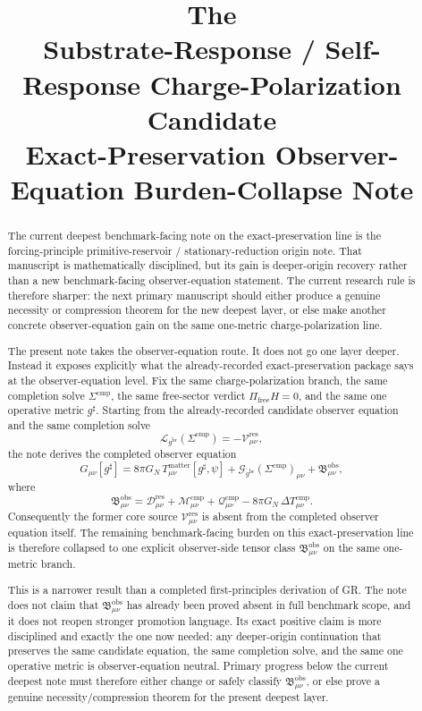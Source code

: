 \documentclass[11pt]{article}
\title{\textbf{The \TheoryName{}}\\[0.4em]
\large Substrate-Response / Self-Response Charge-Polarization Candidate\\
\large Exact-Preservation Observer-Equation Burden-Collapse Note}
\author{}
\date{}
\newcommand{\ObserverMetric}{g^{\mathrm{br}}}
\newcommand{\CompletedMetric}{g^{\sharp}}
\newcommand{\CompShift}{\Sigma^{\mathrm{cmp}}}
\newcommand{\ResidualCore}{\mathcal V_{\mu\nu}^{\mathrm{res}}}
\newcommand{\ResidualDec}{\mathcal D_{\mu\nu}^{\mathrm{res}}}
\newcommand{\ReducedEin}{\mathcal L_{\ObserverMetric}}
\newcommand{\GaugeBook}{\mathcal G_{\ObserverMetric}}
\newcommand{\CompMix}{\mathcal M_{\mu\nu}^{\mathrm{cmp}}}
\newcommand{\CompQuad}{\mathcal Q_{\mu\nu}^{\mathrm{cmp}}}
\newcommand{\DeltaTComp}{\Delta T_{\mu\nu}^{\mathrm{cmp}}}
\newcommand{\ObsBurden}{\mathfrak B_{\mu\nu}^{\mathrm{obs}}}
\begin{document}
\maketitle

\begin{abstract}
The current deepest benchmark-facing note on the exact-preservation line is the forcing-principle primitive-reservoir / stationary-reduction origin note. That manuscript is mathematically disciplined, but its gain is deeper-origin recovery rather than a new benchmark-facing observer-equation statement. The current research rule is therefore sharper: the next primary manuscript should either produce a genuine necessity or compression theorem for the new deepest layer, or else make another concrete observer-equation gain on the same one-metric charge-polarization line.

The present note takes the observer-equation route. It does not go one layer deeper. Instead it exposes explicitly what the already-recorded exact-preservation package says at the observer-equation level. Fix the same charge-polarization branch, the same completion solve \(\Sigma^{\mathrm{cmp}}\), the same free-sector verdict \(\Pi_{\mathrm{free}}H=0\), and the same one operative metric \(\CompletedMetric\). Starting from the already-recorded candidate observer equation and the same completion solve
\[
\ReducedEin(\CompShift)=-\ResidualCore,
\]
the note derives the completed observer equation
\[
G_{\mu\nu}[\CompletedMetric]
=
8\pi G_N\,T_{\mu\nu}^{\mathrm{matter}}[\CompletedMetric,\psi]
+\GaugeBook(\CompShift)_{\mu\nu}
+\ObsBurden,
\]
where
\[
\ObsBurden
=
\ResidualDec+\CompMix+\CompQuad-8\pi G_N\,\DeltaTComp.
\]
Consequently the former core source \(\ResidualCore\) is absent from the completed observer equation itself. The remaining benchmark-facing burden on this exact-preservation line is therefore collapsed to one explicit observer-side tensor class \(\ObsBurden\) on the same one-metric branch.

This is a narrower result than a completed first-principles derivation of GR. The note does not claim that \(\ObsBurden\) has already been proved absent in full benchmark scope, and it does not reopen stronger promotion language. Its exact positive claim is more disciplined and exactly the one now needed: any deeper-origin continuation that preserves the same candidate equation, the same completion solve, and the same one operative metric is observer-equation neutral. Primary progress below the current deepest note must therefore either change or safely classify \(\ObsBurden\), or else prove a genuine necessity/compression theorem for the present deepest layer.
\end{abstract}
\end{document}
